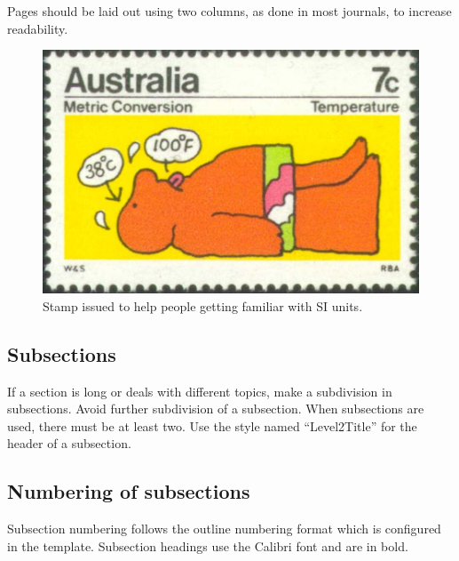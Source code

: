 \documentclass[10pt]{imeko_acta}
\begin{document}
Pages should be laid out using two columns, as done in most journals, to increase readability.

\begin{figure}
	\centering
	\includegraphics[width=0.7\linewidth]{image1}
	\vspace*{6pt}
	\caption{Stamp issued to help people getting familiar with SI units.}
	\label{fig:image1}
\end{figure}

	

\subsection{Subsections} \label{sec:sub1}

If a section is long or deals with different topics, make a subdivision in subsections. Avoid further subdivision of a subsection. When subsections are used, there must be at least two. Use the style named ``Level2Title'' for the header of a subsection.

\subsection{Numbering of subsections}

Subsection numbering follows the outline numbering format which is configured in the template. Subsection headings use the Calibri font and are in bold.
\end{document}

